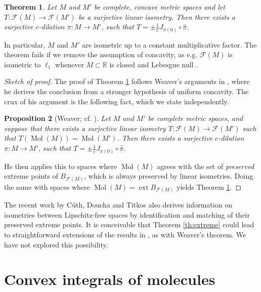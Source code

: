 \documentclass[a4paper,10pt]{amsart}
\DeclareMathOperator{\ext}{ext}                             %
\newcommand{\RR}{\mathbb{R}}                                %
\newcommand{\lipfree}[1]{\mathcal{F}({#1})}                 %
\DeclareMathOperator{\Mol}{Mol}                              %
\theoremstyle{plain}
\newtheorem{theorem}{Theorem}[section]
\newtheorem{proposition}[theorem]{Proposition}
\theoremstyle{definition}
\theoremstyle{remark}
\begin{document}
\begin{theorem}\label{th:banach-stone}
Let $M$ and $M'$ be complete, concave metric spaces and let $T:\lipfree{M}\to\lipfree{M'}$ be a surjective linear isometry. Then there exists a surjective $c$-dilation $\pi:M\to M'$, such that $T=\pm\frac{1}{c}J_{\pi(0)}\circ\widehat{\pi}$.
\end{theorem}

In particular, $M$ and $M'$ are isometric up to a constant multiplicative factor. The theorem fails if we remove the assumption of concavity, as e.g. $\lipfree{M}$ is isometric to $\ell_1$ whenever $M\subset\RR$ is closed and Lebesgue null \cite{Godard}.


\begin{proof}[Sketch of proof] The proof of Theorem \ref{th:banach-stone} follows Weaver's arguments in \cite[Section 3.8]{Weaver2}, where he derives the conclusion from a stronger hypothesis of uniform concavity. The crux of his argument is the following fact, which we state independently.

\begin{proposition}[Weaver; cf. {\cite[Lemma 3.54 and Theorem 3.55]{Weaver2}}]
Let $M$ and $M'$ be complete metric spaces, and suppose that there exists a surjective linear isometry $T:\lipfree{M}\to\lipfree{M'}$ such that $T(\Mol(M))=\Mol(M')$. Then there exists a surjective $c$-dilation $\pi:M\to M'$, such that $T=\pm\frac{1}{c}J_{\pi(0)}\circ\widehat{\pi}$.
\end{proposition}

\noindent He then applies this to spaces where $\Mol(M)$ agrees with the set of \emph{preserved} extreme points of $B_{\lipfree{M}}$, which is always preserved by linear isometries. Doing the same with spaces where $\Mol(M)=\ext B_{\lipfree{M}}$ yields Theorem \ref{th:banach-stone}.
\end{proof}

The recent work \cite{CDT_24} by C\'uth, Doucha and Titkos also derives information on isometries between Lipschitz-free spaces by identification and matching of their preserved extreme points. It is conceivable that Theorem \ref{th:extreme} could lead to straightforward extensions of the results in \cite{CDT_24}, as with Weaver's theorem. We have not explored this possibility.



\section{Convex integrals of molecules}
\label{sec:cims}
\end{document}
